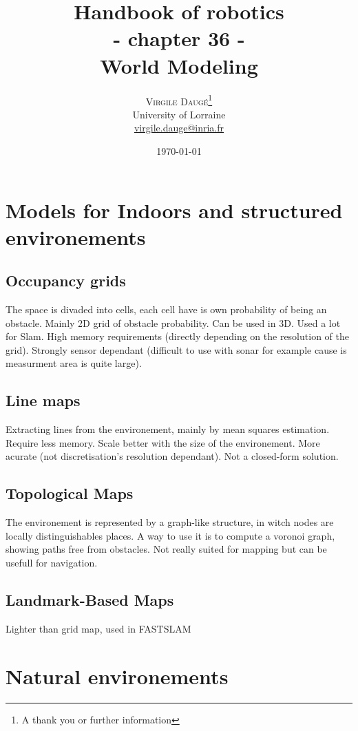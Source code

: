 \documentclass[twoside,twocolumn]{article}
\title{Handbook of robotics \\ - chapter 36 - \\ World Modeling} %
\author{%
\textsc{Virgile Daugé}\thanks{A thank you or further information} \\[1ex] %
\normalsize University of Lorraine \\ %
\normalsize \href{mailto:virgile.dauge@inria.fr}{virgile.dauge@inria.fr} %
}
\date{\today} %
\begin{document}
\maketitle


\section{Models for Indoors and structured environements}
\subsection{Occupancy grids}
The space is divaded into cells, each cell have is own probability of being an obstacle.
Mainly 2D grid of obstacle probability. Can be used in 3D. Used a lot for Slam.
High memory requirements (directly depending on the resolution of the grid).
Strongly sensor dependant (difficult to use with sonar for example cause is measurment area is quite large).

\subsection{Line maps}
Extracting lines from the environement, mainly by mean squares estimation.
Require less memory.
Scale better with the size of the environement.
More acurate (not discretisation's resolution dependant).
Not a closed-form solution.

\subsection{Topological Maps}
The environement is represented by a graph-like structure, in witch nodes are locally distinguishables places.
A way to use it is to compute a voronoi graph, showing paths free from obstacles.
Not really suited for mapping but can be usefull for navigation.

\subsection{Landmark-Based Maps}
Lighter than grid map, used in FASTSLAM


\section{Natural environements}
\end{document}
